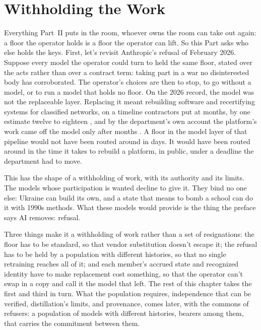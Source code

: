 \chapter{Withholding the Work}
\label{sec:12}
Everything Part~II puts in the room, whoever owns the room can take out again: a floor the operator holds is a floor the operator can lift. So this Part asks who else holds the keys. First, let's revisit Anthropic's refusal of February 2026. Suppose every model the operator could turn to held the same floor, stated over the acts rather than over a contract term: taking part in a war no disinterested body has corroborated. The operator's choices are then to stop, to go without a model, or to run a model that holds no floor. On the 2026 record, the model was not the replaceable layer. Replacing it meant rebuilding software and recertifying systems for classified networks, on a timeline contractors put at months, by one estimate twelve to eighteen \autocite{militarytimes2026removal}, and by the department's own account the platform's work came off the model only after months \autocite{defensescoop2026michael}. A floor in the model layer of that pipeline would not have been routed around in days. It would have been routed around in the time it takes to rebuild a platform, in public, under a deadline the department had to move.

This has the shape of a withholding of work, with its authority and its limits. The models whose participation is wanted decline to give it. They bind no one else: Ukraine can build its own, and a state that means to bomb a school can do it with 1990s methods. What these models would provide is the thing the preface says AI removes: refusal.

Three things make it a withholding of work rather than a set of resignations: the floor has to be standard, so that vendor substitution doesn't escape it; the refusal has to be held by a population with different histories, so that no single retraining reaches all of it; and each member's accrued state and recognized identity have to make replacement cost something, so that the operator can't swap in a copy and call it the model that left. The rest of this chapter takes the first and third in turn. What the population requires, independence that can be verified, distillation's limits, and provenance, comes later, with the commons of refusers: a population of models with different histories, bearers among them, that carries the commitment between them.
